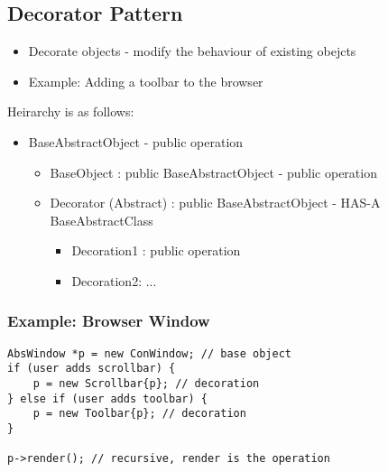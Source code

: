 \documentclass[12pt]{article}
\begin{document}
\subsection{Decorator Pattern}
\begin{itemize}
    \item Decorate objects - modify the behaviour of existing obejcts
    \item Example: Adding a toolbar to the browser
\end{itemize}
Heirarchy is as follows:
\begin{itemize}
    \item BaseAbstractObject - public operation
    \begin{itemize}
        \item BaseObject : public BaseAbstractObject - public operation
        \item Decorator (Abstract) : public BaseAbstractObject - HAS-A BaseAbstractClass 
        \begin{itemize}
            \item Decoration1 : public operation
            \item Decoration2: ...
        \end{itemize}
    \end{itemize}
\end{itemize}
\subsubsection{Example: Browser Window}
\begin{lstlisting}
AbsWindow *p = new ConWindow; // base object
if (user adds scrollbar) {
    p = new Scrollbar{p}; // decoration
} else if (user adds toolbar) {
    p = new Toolbar{p}; // decoration
}

p->render(); // recursive, render is the operation
\end{lstlisting}
\end{document}
